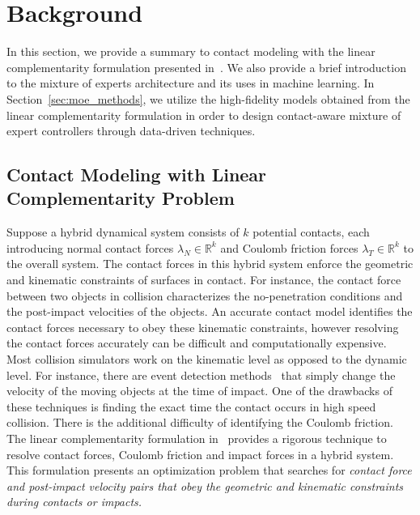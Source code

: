
\section{Background}

In this section, we provide a summary to contact modeling with the linear
complementarity formulation presented in~\cite{glocker2005formulation}.
%
We also provide a brief introduction to the mixture of experts architecture and
its uses in machine learning.
%
In Section~\ref{sec:moe_methods}, we utilize the high-fidelity models obtained
from the linear complementarity formulation in order to design contact-aware
mixture of expert controllers through data-driven techniques.

\subsection{Contact Modeling with Linear Complementarity Problem}

Suppose a hybrid dynamical system consists of $k$ potential contacts, each
introducing normal contact forces $\lambda_N \in \mathbb{R}^{k}$ and Coulomb
friction forces $\lambda_T \in \mathbb{R}^{k}$ to the overall system.
%
The contact forces in this hybrid system enforce the geometric and kinematic
constraints of surfaces in contact.
%
For instance, the contact force between two objects in collision characterizes
the no-penetration conditions and the post-impact velocities of the objects.
%
An accurate contact model identifies the contact forces necessary to obey these
kinematic constraints, however resolving the contact forces accurately can be
difficult and computationally expensive.
%
Most collision simulators work on the kinematic level as opposed to the dynamic
level.
%
For instance, there are event detection methods~\cite{cellier1986combined} that
simply change the velocity of the moving objects at the time of impact.
%
One of the drawbacks of these techniques is finding the exact time the contact
occurs in high speed collision.
%
There is the additional difficulty of identifying the Coulomb friction.
%
The linear complementarity formulation in~\cite{glocker2005formulation} provides
a rigorous technique to resolve contact forces, Coulomb friction and impact
forces in a hybrid system.
%
This formulation presents an optimization problem that searches for \it{contact force
and post-impact velocity} \normalfont pairs that obey the geometric and
kinematic constraints during contacts or impacts.
%

